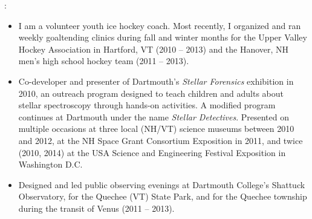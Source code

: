 \documentclass[12pt, a4paper]{article}
\begin{document}
\vspace{0.5\baselineskip}

:
\begin{itemize}
	\item I am a volunteer youth ice hockey coach. Most recently, I organized and ran weekly goaltending clinics during fall and winter months for the Upper Valley Hockey Association in Hartford, VT (2010 -- 2013) and the Hanover, NH men's high school hockey team (2011 -- 2013).
	
    \item Co-developer and presenter of Dartmouth's \emph{Stellar Forensics} exhibition in 2010, an outreach program designed
    to teach children and adults about stellar spectroscopy through hands-on activities. A modified program continues 
    at Dartmouth under the name \emph{Stellar Detectives}. Presented on multiple occasions at three local (NH/VT)
    science museums between 2010 and 2012, at the NH Space Grant Consortium Exposition in 2011, and twice (2010, 2014)
    at the USA Science and Engineering Festival Exposition in Washington D.C. 
    \item Designed and led public observing evenings at Dartmouth College's Shattuck Observatory, for the Quechee (VT) State Park, and for the Quechee township during the transit of Venus (2011 -- 2013). 
\end{itemize}

\clearpage 
\end{document}
